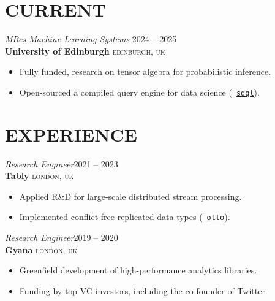 \documentclass[line, margin]{res}
\begin{document}


\address{\small\texttt{
\faGlobe \ \url{https://www.sparsity.ai}\ \ \ \ \ \ \ \ \ \ \ \ \ \ \ \ \ \ \ \ \
\faPhone \ \href{tel:+44-74533-31777}{+44 74 5333 1777}\ \
\faEnvelope \ \href{mailto:alexander.mascolo@gmail.com}{\nolinkurl{alexander.mascolo@gmail.com}}
}}

\begin{resume}

\section{CURRENT}

{\sl MRes Machine Learning Systems}
\hfill 2024 -- 2025\\
\textbf{University of Edinburgh} \hfill \textsc{edinburgh, uk}
\vspace{4pt}
\begin{itemize}
	\item Fully funded, research on tensor algebra for probabilistic inference.
	\item Open-sourced a compiled query engine for data science (\faGithub\  \href{https://github.com/edin-dal/sdql}{\texttt{sdql}}).
\end{itemize}

\section{EXPERIENCE}

{\sl Research Engineer}\hfill 2021 -- 2023\\
\textbf{Tably} \hfill \textsc{london, uk}
\vspace{4pt}
	\begin{itemize}
		\item Applied R\&D for large-scale distributed stream processing.
		\item Implemented conflict-free replicated data types (\faGithub\  \href{https://github.com/tablyinc/otto-test}{\texttt{otto}}).
	\end{itemize}

{\sl Research Engineer}\hfill 2019 -- 2020\\
\textbf{Gyana} \hfill \textsc{london, uk}
\vspace{4pt}
	\begin{itemize}
		\item Greenfield development of high-performance analytics libraries.
		\item Funding by top VC investors, including the co-founder of Twitter.
	\end{itemize}


\end{resume}
\end{document}
